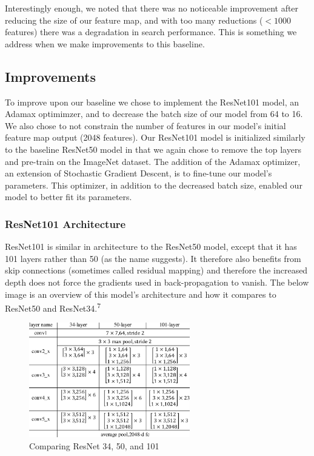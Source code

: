 \documentclass[conference]{IEEEtran}
\begin{document}
Interestingly enough, we noted that there was no noticeable improvement after reducing the size of our feature map, and with too many reductions ($<1000$ features) there was a degradation in search performance. This is something we address when we make improvements to this baseline.

\subsection{Improvements}

To improve upon our baseline we chose to implement the ResNet101 model, an Adamax optimimzer, and to decrease the batch size of our model from 64 to 16. We also chose to not constrain the number of features in our model's initial feature map output (2048 features). Our ResNet101 model is initialized similarly to the baseline ResNet50 model in that we again chose to remove the top layers and pre-train on the ImageNet dataset. The addition of the Adamax optimizer, an extension of Stochastic Gradient Descent, is to fine-tune our model's parameters. This optimizer, in addition to the decreased batch size, enabled our model to better fit its parameters. 

\subsubsection{ResNet101 Architecture}

ResNet101 is similar in architecture to the ResNet50 model, except that it has 101 layers rather than 50 (as the name suggests). It therefore also benefits from skip connections (sometimes called residual mapping) and therefore the increased depth does not force the gradients used in back-propagation to vanish. The below image is an overview of this model's architecture and how it compares to ResNet50 and ResNet34.\textsuperscript{7}

\begin{figure} [h]
    \centering
    \includegraphics[width=7cm]{resnet compare.png}
    \caption{Comparing ResNet 34, 50, and 101}
    \label{fig:5}
\end{figure}
\end{document}
